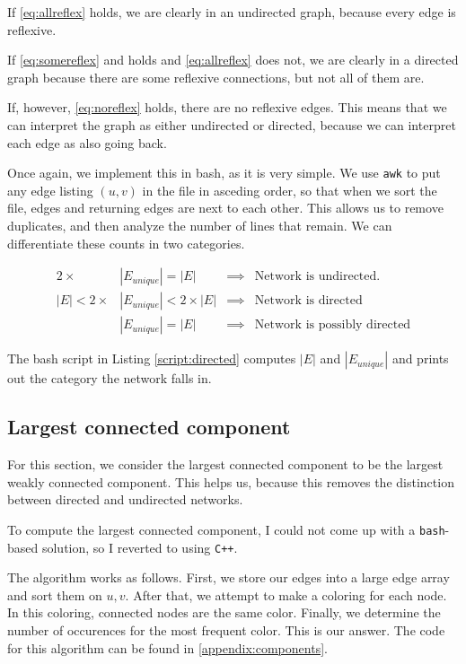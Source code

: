 \documentclass[12pt,a4paper,hidelinks]{article}
\begin{document}
If \ref{eq:allreflex} holds, we are clearly in an undirected graph, because every edge is reflexive.

If \ref{eq:somereflex} and holds and \ref{eq:allreflex} does not, we are clearly in a directed graph because there are some reflexive connections, but not all of them are.

If, however, \ref{eq:noreflex} holds, there are no reflexive edges. This means that we can interpret the graph as either undirected or directed, because we can interpret each edge as also going back.

Once again, we implement this in bash, as it is very simple. We use \texttt{awk} to put any edge listing $(u, v)$ in the file in asceding order, so that when we sort the file, edges and returning edges are next to each other. This allows us to remove duplicates, and then analyze the number of lines that remain. We can differentiate these counts in two categories.

\begin{align*}
2 \times & |E_{unique}| = |E| & \implies & \text{Network is undirected.} \\
|E| < 2 \times & |E_{unique}| < 2 \times |E| & \implies & \text{Network is directed} \\
& |E_{unique}| = |E| & \implies & \text{Network is possibly directed}
\end{align*}

The bash script in Listing \ref{script:directed} computes $|E|$ and $|E_{unique}|$ and prints out the category the network falls in.



\subsection{Largest connected component}

For this section, we consider the largest connected component to be the largest weakly connected component. This helps us, because this removes the distinction between directed and undirected networks.

To compute the largest connected component, I could not come up with a \texttt{bash}-based solution, so I reverted to using \texttt{C++}.

The algorithm works as follows. First, we store our edges into a large edge array and sort them on $u, v$. After that, we attempt to make a coloring for each node. In this coloring, connected nodes are the same color. Finally, we determine the number of occurences for the most frequent color. This is our answer. The code for this algorithm can be found in \autoref{appendix:components}.
\end{document}

